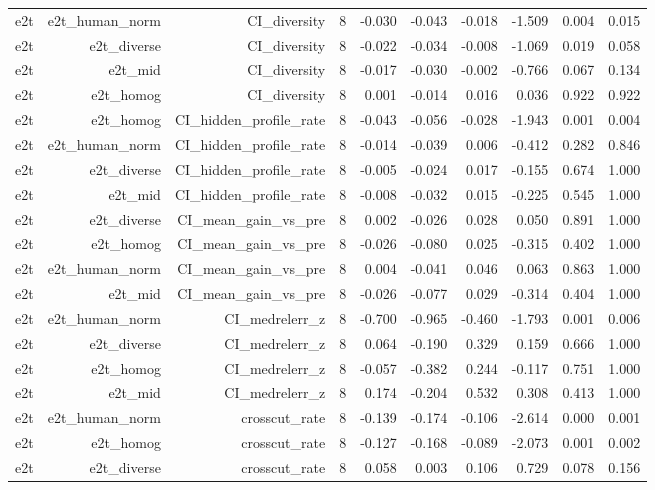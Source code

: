 \documentclass[11pt]{article}
\begin{document}
\begin{landscape}
\begin{longtable}{@{}lrrrrrrrrr@{}}
e2t & e2t\_human\_norm & CI\_diversity & 8 & -0.030 & -0.043 & -0.018 & -1.509 & 0.004 & 0.015 \\
e2t & e2t\_diverse & CI\_diversity & 8 & -0.022 & -0.034 & -0.008 & -1.069 & 0.019 & 0.058 \\
e2t & e2t\_mid & CI\_diversity & 8 & -0.017 & -0.030 & -0.002 & -0.766 & 0.067 & 0.134 \\
e2t & e2t\_homog & CI\_diversity & 8 & 0.001 & -0.014 & 0.016 & 0.036 & 0.922 & 0.922 \\
e2t & e2t\_homog & CI\_hidden\_profile\_rate & 8 & -0.043 & -0.056 & -0.028 & -1.943 & 0.001 & 0.004 \\
e2t & e2t\_human\_norm & CI\_hidden\_profile\_rate & 8 & -0.014 & -0.039 & 0.006 & -0.412 & 0.282 & 0.846 \\
e2t & e2t\_diverse & CI\_hidden\_profile\_rate & 8 & -0.005 & -0.024 & 0.017 & -0.155 & 0.674 & 1.000 \\
e2t & e2t\_mid & CI\_hidden\_profile\_rate & 8 & -0.008 & -0.032 & 0.015 & -0.225 & 0.545 & 1.000 \\
e2t & e2t\_diverse & CI\_mean\_gain\_vs\_pre & 8 & 0.002 & -0.026 & 0.028 & 0.050 & 0.891 & 1.000 \\
e2t & e2t\_homog & CI\_mean\_gain\_vs\_pre & 8 & -0.026 & -0.080 & 0.025 & -0.315 & 0.402 & 1.000 \\
e2t & e2t\_human\_norm & CI\_mean\_gain\_vs\_pre & 8 & 0.004 & -0.041 & 0.046 & 0.063 & 0.863 & 1.000 \\
e2t & e2t\_mid & CI\_mean\_gain\_vs\_pre & 8 & -0.026 & -0.077 & 0.029 & -0.314 & 0.404 & 1.000 \\
e2t & e2t\_human\_norm & CI\_medrelerr\_z & 8 & -0.700 & -0.965 & -0.460 & -1.793 & 0.001 & 0.006 \\
e2t & e2t\_diverse & CI\_medrelerr\_z & 8 & 0.064 & -0.190 & 0.329 & 0.159 & 0.666 & 1.000 \\
e2t & e2t\_homog & CI\_medrelerr\_z & 8 & -0.057 & -0.382 & 0.244 & -0.117 & 0.751 & 1.000 \\
e2t & e2t\_mid & CI\_medrelerr\_z & 8 & 0.174 & -0.204 & 0.532 & 0.308 & 0.413 & 1.000 \\
e2t & e2t\_human\_norm & crosscut\_rate & 8 & -0.139 & -0.174 & -0.106 & -2.614 & 0.000 & 0.001 \\
e2t & e2t\_homog & crosscut\_rate & 8 & -0.127 & -0.168 & -0.089 & -2.073 & 0.001 & 0.002 \\
e2t & e2t\_diverse & crosscut\_rate & 8 & 0.058 & 0.003 & 0.106 & 0.729 & 0.078 & 0.156 \\

\end{longtable}
\end{landscape}
\end{document}
